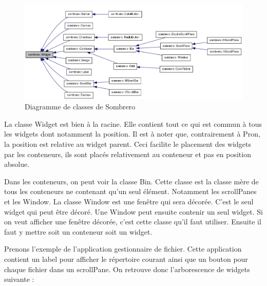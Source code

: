 \begin{figure}[H]
  \centering
  \includegraphics[width=17.5cm]{images/classDiagWidget.png}
  \caption{Diagramme de classes de Sombrero}
  \label{fig:diagrame_classes_sombrero}
\end{figure}

La classe Widget est bien à la racine.
Elle contient tout ce qui est commun à tous les widgets dont notamment la position.
Il est à noter que, contrairement à Pron, la position est relative au widget parent.
Ceci facilite le placement des widgets par les conteneurs, ils sont placés relativement au conteneur et pas en position absolue.

Dans les conteneurs, on peut voir la classe Bin.
Cette classe est la classe mère de tous les conteneurs ne contenant qu'un seul élément.
Notamment les scrollPanes et les Window.
La classe Window est une fenêtre qui sera décorée.
C'est le seul widget qui peut être décoré.
Une Window peut ensuite contenir un seul widget.
Si on veut afficher une fenêtre décorée, c'est cette classe qu'il faut utiliser.
Ensuite il faut y mettre soit un conteneur soit un widget.

Prenons l'exemple de l'application gestionnaire de fichier.
Cette application contient un label pour afficher le répertoire courant ainsi que un bouton pour chaque fichier dans un scrollPane. On retrouve donc l'arborescence de widgets suivante :

\begin{center}
\end{center}

